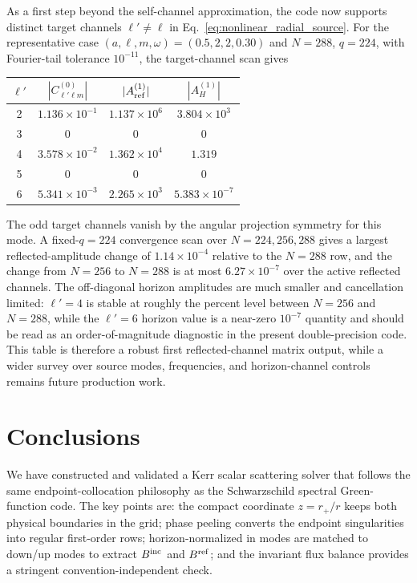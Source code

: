 \documentclass[aps,prd,twocolumn,nofootinbib,superscriptaddress,10pt]{revtex4-2}
\newcommand{\rp}{r_+}
\newcommand{\Bin}{B^{\rm inc}}
\newcommand{\Bref}{B^{\rm ref}}
\begin{document}
As a first step beyond the self-channel approximation, the code now supports
distinct target channels $\ell'\ne\ell$ in Eq.~\eqref{eq:nonlinear_radial_source}.
For the representative case $(a,\ell,m,\omega)=(0.5,2,2,0.30)$ and
$N=288$, $q=224$, with Fourier-tail tolerance $10^{-11}$, the
target-channel scan gives
\begin{center}
\begin{tabular}{c c c c}
\toprule
$\ell'$ & $|C^{(0)}_{\ell'\ell m}|$ &
$|A_{\rm ref}^{(1)}|$ & $|A_H^{(1)}|$\\
\midrule
2 & $1.136\times10^{-1}$ & $1.137\times10^6$ & $3.804\times10^3$\\
3 & $0$ & $0$ & $0$\\
4 & $3.578\times10^{-2}$ & $1.362\times10^4$ & $1.319$\\
5 & $0$ & $0$ & $0$\\
6 & $5.341\times10^{-3}$ & $2.265\times10^3$ & $5.383\times10^{-7}$\\
\bottomrule
\end{tabular}
\end{center}
The odd target channels vanish by the angular projection symmetry for this
mode.  A fixed-$q=224$ convergence scan over $N=224,256,288$ gives a
largest reflected-amplitude change of $1.14\times10^{-4}$ relative to the
$N=288$ row, and the change from $N=256$ to $N=288$ is at most
$6.27\times10^{-7}$ over the active reflected channels.  The off-diagonal
horizon amplitudes are much smaller and cancellation limited: $\ell'=4$ is
stable at roughly the percent level between $N=256$ and $N=288$, while the
$\ell'=6$ horizon value is a near-zero $10^{-7}$ quantity and should be read
as an order-of-magnitude diagnostic in the present double-precision code.
This table is therefore a robust first reflected-channel matrix output, while
a wider survey over source modes, frequencies, and horizon-channel controls
remains future production work.

\section{Conclusions}
\label{sec:conclusion}

We have constructed and validated a Kerr scalar scattering solver that follows
the same endpoint-collocation philosophy as the Schwarzschild spectral
Green-function code.  The key points are: the compact coordinate $z=\rp/r$
keeps both physical boundaries in the grid; phase peeling converts the endpoint
singularities into regular first-order rows; horizon-normalized in modes are
matched to down/up modes to extract $\Bin$ and $\Bref$; and the invariant flux
balance provides a stringent convention-independent check.
\end{document}
